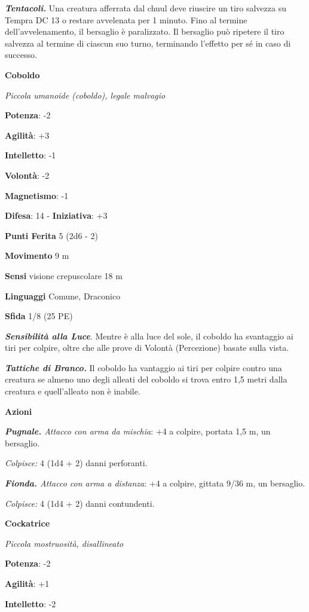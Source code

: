 \begin{multicols}{2}
\emph{\textbf{Tentacoli.}} Una creatura afferrata dal chuul deve
riuscire un tiro salvezza su Tempra DC 13 o restare avvelenata per
1 minuto. Fino al termine dell'avvelenamento, il bersaglio è
paralizzato. Il bersaglio può ripetere il tiro salvezza al termine di
ciascun suo turno, terminando l'effetto per sé in caso di successo.

\textbf{Coboldo}

\emph{Piccola umanoide (coboldo), legale malvagio}

\textbf{Potenza}: -2

\textbf{Agilità}: +3

\textbf{Intelletto}: -1

\textbf{Volontà}: -2

\textbf{Magnetismo}: -1

\textbf{Difesa}: 14 - \textbf{Iniziativa}: +3

\textbf{Punti Ferita} 5 (2d6 - 2)

\textbf{Movimento} 9 m

\textbf{Sensi} visione crepuscolare 18 m

\textbf{Linguaggi} Comune, Draconico

\textbf{Sfida} 1/8 (25 PE)

\emph{\textbf{Sensibilità alla Luce}}. Mentre è alla luce del sole, il
coboldo ha svantaggio ai tiri per colpire, oltre che alle prove di
Volontà (Percezione) basate sulla vista.

\emph{\textbf{Tattiche di Branco.}} Il coboldo ha vantaggio ai tiri per
colpire contro una creatura se almeno uno degli alleati del coboldo si
trova entro 1,5 metri dalla creatura e quell'alleato non è inabile.

\textbf{Azioni}

\emph{\textbf{Pugnale.} Attacco con arma da mischia}: +4 a colpire,
portata 1,5 m, un bersaglio.

\emph{Colpisce:} 4 (1d4 + 2) danni perforanti.

\emph{\textbf{Fionda.} Attacco con arma a distanza}: +4 a colpire,
gittata 9/36 m, un bersaglio.

\emph{Colpisce:} 4 (1d4 + 2) danni contundenti.

\textbf{Cockatrice}

\emph{Piccola mostruosità, disallineato}

\textbf{Potenza}: -2

\textbf{Agilità}: +1

\textbf{Intelletto}: -2


\end{multicols}
